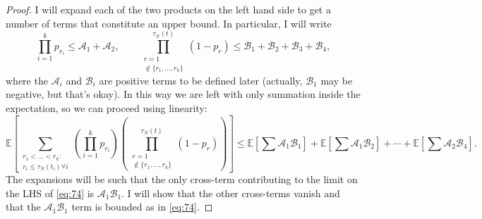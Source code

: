 \documentclass{article}
\newcommand{\E}{\mathbb{E}}
\newcommand{\1}[1]{\mathbbm{1}_{#1}}
\begin{document}
\begin{proof}
I will expand each of the two products on the left hand side to get a number of terms that constitute an upper bound. In particular, I will write
\begin{equation}
\prod_{i=1}^k p_{r_i} \leq \mathscr{A}_1 + \mathscr{A}_2 , \qquad
\prod_{\substack{r=1 \\ \notin \{r_1,\dots,r_k\} }}^{\tau_N(t)} (1-p_r) \leq \mathscr{B}_1 + \mathscr{B}_2 + \mathscr{B}_3 + \mathscr{B}_4 ,
\end{equation}
where the $\mathscr{A}_i$ and $\mathscr{B}_i$ are positive terms to be defined later (actually, $\mathscr{B}_1$ may be negative, but that's okay).
In this way we are left with only summation inside the expectation, so we can proceed using linearity:
\begin{equation}
\E \left[ \sum_{\substack{r_1 <\dots< r_k :\\ r_i \leq \tau_N(t_i) \forall i}}
\left( \prod_{i=1}^k p_{r_i} \right)
\left( \prod_{\substack{r=1 \\ \notin \{r_1,\dots,r_k\} }}^{\tau_N(t)} (1-p_r) \right) \right]
\leq
\E\left[ \sum \mathscr{A}_1 \mathscr{B}_1 \right] + \E\left[ \sum \mathscr{A}_1 \mathscr{B}_2 \right] + \cdots + \E\left[ \sum \mathscr{A}_2 \mathscr{B}_4 \right].
\end{equation}
The expansions will be such that the only cross-term contributing to the limit on the LHS of \eqref{eq:74} is $\mathscr{A}_1 \mathscr{B}_1$. I will show that the other cross-terms vanish and that the $\mathscr{A}_1 \mathscr{B}_1$ term is bounded as in \eqref{eq:74}.


\end{proof}
\end{document}
